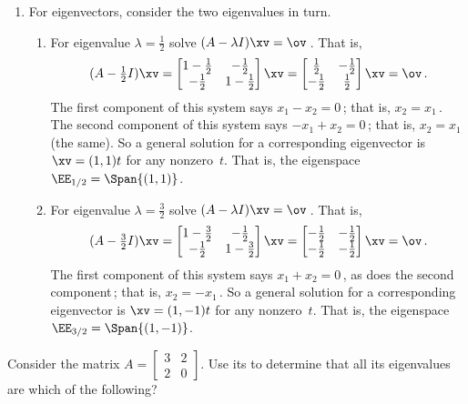 \begin{example}
\begin{solution}
\begin{enumerate}
\item For eigenvectors, consider the two eigenvalues in turn.
\begin{enumerate}
\item For eigenvalue \(\lambda=\frac12\) solve \((A-\lambda I)\xv=\ov\)\,.  That is,
\begin{equation*}
(A-\tfrac12I)\xv
=\begin{bmatrix} 1-\frac12&-\frac12\\
-\frac12&1-\frac12 \end{bmatrix}\xv
=\begin{bmatrix} \frac12&-\frac12\\
-\frac12&\frac12 \end{bmatrix}\xv
=\ov\,.
\end{equation*}
The first component of this system says \(x_1-x_2=0\)\,; that is, \(x_2=x_1\)\,.  
The second component of this system says \(-x_1+x_2=0\)\,; that is, \(x_2=x_1\) (the same).  
So a general solution for a corresponding eigenvector is \(\xv=(1,1)t\) for any nonzero~\(t\).
That is, the eigenspace \(\EE_{1/2}=\Span \{(1,1)\}\).
\item For eigenvalue \(\lambda=\frac32\) solve \((A-\lambda I)\xv=\ov\)\,.  That is,
\begin{equation*}
(A-\tfrac32I)\xv
=\begin{bmatrix} 1-\frac32&-\frac12\\
-\frac12&1-\frac32 \end{bmatrix}\xv
=\begin{bmatrix} -\frac12&-\frac12\\
-\frac12&-\frac12 \end{bmatrix}\xv
=\ov\,.
\end{equation*}
The first component of this system says \(x_1+x_2=0\)\,, as does the second component\,; that is, \(x_2=-x_1\)\,.  
So a general solution for a corresponding eigenvector is \(\xv=(1,-1)t\) for any nonzero~\(t\).
That is, the eigenspace \(\EE_{3/2}=\Span \{(1,-1)\}\).
\aqed

\end{enumerate}
\end{enumerate}
\end{solution}
\end{example}




\begin{activity}
Consider the matrix \(A=\begin{bmatrix} 3&2\\2&0 \end{bmatrix}\).  
Use its  to determine that all its eigenvalues are which of the following?
\end{activity}




